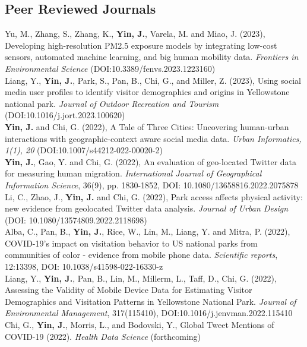 \documentclass[11pt, a4paper]{article}
\newcommand{\years}[1]{\marginnote{\scriptsize #1}}
\begin{document}
\subsection*{Peer Reviewed Journals}
\years{2023}Yu, M., Zhang, S., Zhang, K., \textbf{Yin, J.}, Varela, M. and Miao, J. (2023), Developing high-resolution PM2.5 exposure models by integrating low-cost sensors, automated machine learning, and big human mobility data. \textit{Frontiers in Environmental Science} (DOI:10.3389/fenvs.2023.1223160)\\
\years{2023}Liang, Y., \textbf{Yin, J.}, Park, S., Pan, B., Chi, G., and Miller, Z. (2023), Using social media user profiles to identify visitor demographics and origins in Yellowstone national park. \textit{Journal of Outdoor Recreation and Tourism} (DOI:10.1016/j.jort.2023.100620)\\
\years{2022}\textbf{Yin, J.} and Chi, G. (2022), A Tale of Three Cities: Uncovering human-urban interactions with geographic-context aware social media data. \textit{Urban Informatics, 1(1), 20} (DOI:10.1007/s44212-022-00020-2)\\
\years{2022}\textbf{Yin, J.}, Gao, Y. and Chi, G. (2022), An evaluation of geo-located Twitter data for measuring human migration. \textit{International Journal of Geographical Information Science}, 36(9), pp. 1830-1852, DOI: 10.1080/13658816.2022.2075878\\
\years{2022}Li, C., Zhao, J., \textbf{Yin, J.}  and Chi, G. (2022), Park access affects physical activity: new evidence from geolocated Twitter data analysis. \textit{Journal of Urban Design} (DOI: 10.1080/13574809.2022.2118698)\\
\years{2022}Alba, C., Pan, B., \textbf{Yin, J.},  Rice, W., Lin, M.,  Liang, Y. and Mitra, P. (2022), COVID-19's impact on visitation behavior to US national parks from communities of color - evidence from mobile phone data. \textit{Scientific reports}, 12:13398, DOI: 10.1038/s41598-022-16330-z\\
\years{2022}Liang, Y., \textbf{Yin, J.},  Pan, B.,  Lin, M., Millerm, L., Taff, D., Chi, G. (2022), Assessing the Validity of Mobile Device Data for Estimating Visitor Demographics and Visitation Patterns in Yellowstone National Park. \textit{Journal of Environmental Management}, 317(115410), DOI:10.1016/j.jenvman.2022.115410\\
\years{2022}Chi, G., \textbf{Yin, J.}, Morris, L., and Bodovski, Y., Global Tweet Mentions of COVID-19 (2022). \textit{Health Data Science} (forthcoming)\\
\end{document}

